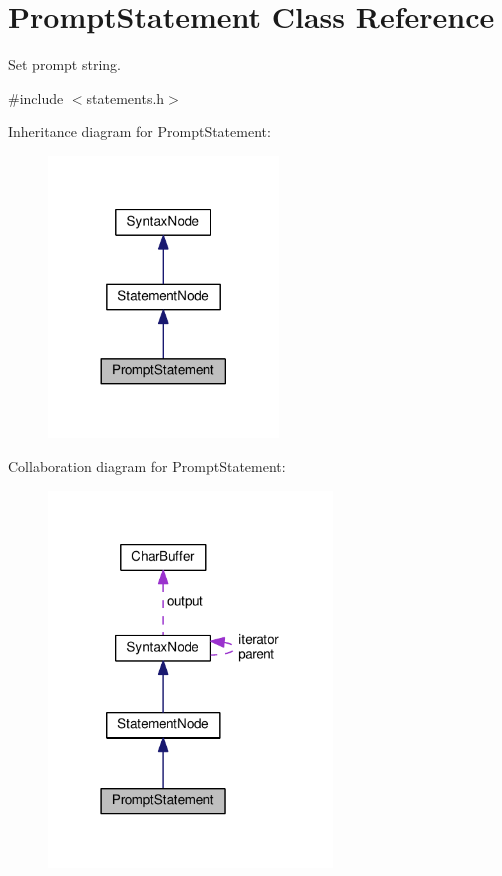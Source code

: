 \hypertarget{classPromptStatement}{}\section{Prompt\+Statement Class Reference}
\label{classPromptStatement}


Set prompt string.  




{\ttfamily \#include $<$statements.\+h$>$}



Inheritance diagram for Prompt\+Statement\+:
\nopagebreak
\begin{figure}[H]
\begin{center}
\leavevmode
\includegraphics[width=173pt]{dc/d70/classPromptStatement__inherit__graph}
\end{center}
\end{figure}


Collaboration diagram for Prompt\+Statement\+:
\nopagebreak
\begin{figure}[H]
\begin{center}
\leavevmode
\includegraphics[width=214pt]{de/d46/classPromptStatement__coll__graph}
\end{center}
\end{figure}
